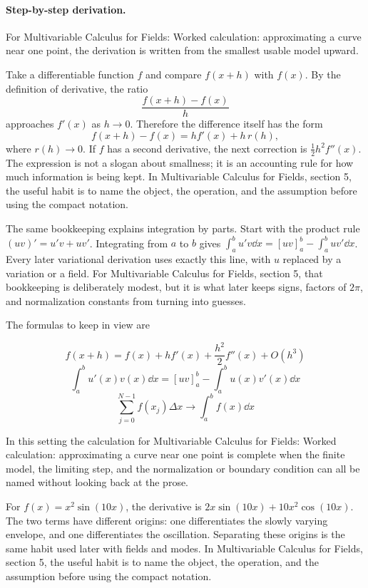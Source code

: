 \paragraph{Step-by-step derivation.}

For Multivariable Calculus for Fields: Worked calculation: approximating a curve near one point, the derivation is written from the smallest usable model upward.

Take a differentiable function \(f\) and compare \(f(x+h)\) with \(f(x)\).  By the definition of derivative, the ratio
\[
  \frac{f(x+h)-f(x)}{h}
\]
approaches \(f'(x)\) as \(h\to0\).  Therefore the difference itself has the form
\[
  f(x+h)-f(x)=hf'(x)+h\,r(h),
\]
where \(r(h)\to0\).  If \(f\) has a second derivative, the next correction is \(\frac12h^2f''(x)\).  The expression is not a slogan about smallness; it is an accounting rule for how much information is being kept.  In Multivariable Calculus for Fields, section 5, the useful habit is to name the object, the operation, and the assumption before using the compact notation.

The same bookkeeping explains integration by parts.  Start with the product rule \((uv)'=u'v+uv'\).  Integrating from \(a\) to \(b\) gives \(\int_a^b u'v\dd x=[uv]_a^b-\int_a^buv'\dd x\).  Every later variational derivation uses exactly this line, with \(u\) replaced by a variation or a field.  For Multivariable Calculus for Fields, section 5, that bookkeeping is deliberately modest, but it is what later keeps signs, factors of \(2\pi\), and normalization constants from turning into guesses.

The formulas to keep in view are

\[
  f(x+h)=f(x)+hf'(x)+\frac{h^2}{2}f''(x)+O(h^3)
\]
\[
  \int_a^b u'(x)v(x)\dd x=[uv]_a^b-\int_a^b u(x)v'(x)\dd x
\]
\[
  \sum_{j=0}^{N-1}f(x_j)\Delta x\longrightarrow \int_a^b f(x)\dd x
\]

In this setting the calculation for Multivariable Calculus for Fields: Worked calculation: approximating a curve near one point is complete when the finite model, the limiting step, and the normalization or boundary condition can all be named without looking back at the prose.




\begin{example}
For \(f(x)=x^2\sin(10x)\), the derivative is \(2x\sin(10x)+10x^2\cos(10x)\).  The two terms have different origins: one differentiates the slowly varying envelope, and one differentiates the oscillation.  Separating these origins is the same habit used later with fields and modes.  In Multivariable Calculus for Fields, section 5, the useful habit is to name the object, the operation, and the assumption before using the compact notation.
\end{example}



